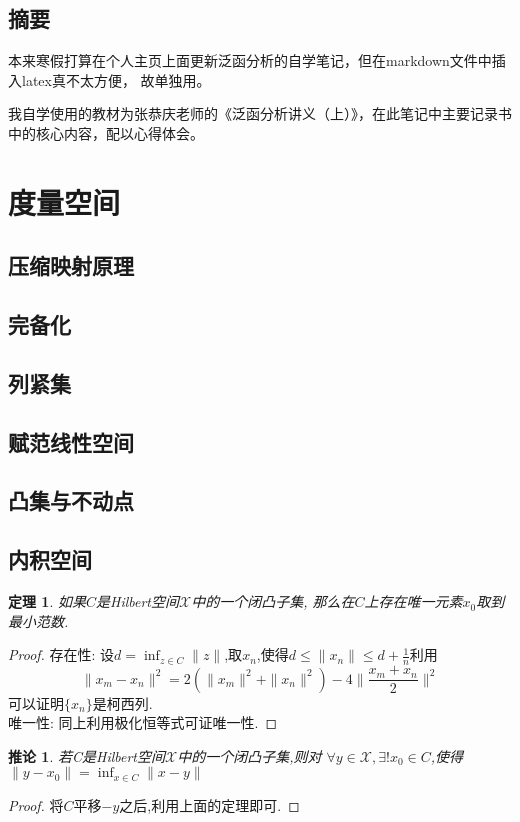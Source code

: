 \documentclass[12pt,a4paper]{article}
\newtheorem{thm}{定理}[subsection]  %
\newtheorem{corollary}{推论}[subsection] %
\begin{document}
\begin{center}
\section*{摘要}
\end{center}

本来寒假打算在个人主页上面更新泛函分析的自学笔记，但在markdown文件中插入latex真不太方便，
故单独用。

我自学使用的教材为张恭庆老师的《泛函分析讲义（上）》，在此笔记中主要记录书中的核心内容，配以心得体会。


{\centering\tableofcontents}

\newpage
\section{度量空间}
\subsection{压缩映射原理}
\subsection{完备化}
\subsection{列紧集}
\subsection{赋范线性空间}
\subsection{凸集与不动点}
\subsection{内积空间}

\begin{thm}
    如果$C$是\rm{Hilbert}空间$\mathscr{X}$中的一个闭凸子集,
    那么在$C$上存在唯一元素$x_0$取到最小范数.
\end{thm}
\begin{proof}
    存在性: 设$d= \inf_{z \in C}\|z\|$,取$x_n$,使得$d\leq \|x_n\|\leq d + \frac{1}{n}$利用
    \[\|x_m - x_n\|^2 = 2(\|x_m\|^2+\|x_n\|^2)-4\|\frac{x_m + x_n}{2}\|^2\]
    可以证明$\{x_n\}$是柯西列.\\
    唯一性: 同上利用极化恒等式可证唯一性.
\end{proof}
\begin{corollary}
    若C是\rm{Hilbert}空间$\mathscr{X}$中的一个闭凸子集,则对
    $\forall y \in \mathscr{X},\exists !x_0 \in C$,使得\\$\|y-x_0\| = \inf_{x\in C}\|x-y\|$
\end{corollary}
\begin{proof}
    将$C$平移$-y$之后,利用上面的定理即可.
\end{proof}
\end{document}
